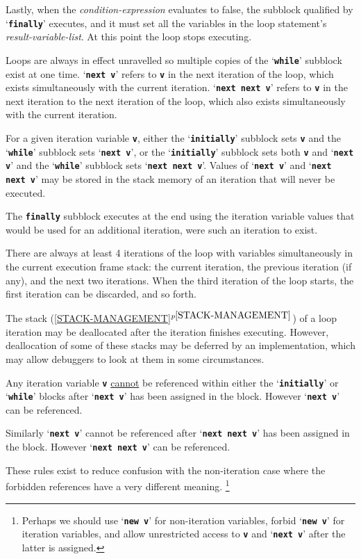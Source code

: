 \documentclass[12pt]{article}
\makeatletter
\newcommand{\TT}[1]{{\tt \bfseries #1}}
\newcommand{\ttkey}[1]{\TT{#1}\index{#1@{\tt #1}}}
\newcommand{\itemref}[1]{\ref{#1}$^{p\pageref{#1}}$}
\makeatother
\begin{document}
Lastly, when
the {\em condition-expression} evaluates to false, the
subblock qualified by `\ttkey{finally}'
executes, and it must set all the variables in the
loop statement's {\em result-variable-list}.  At this point the loop stops
executing.

Loops are always in effect unravelled so multiple copies of
the `\TT{while}' subblock exist at one time.
`\TT{next v}' refers to \TT{v} in the
next iteration of the loop, which exists simultaneously with
the current iteration.  `\TT{next next v}' refers to \TT{v}
in the next iteration to the next iteration of the loop, which
also exists simultaneously with the current iteration.

For a given iteration variable \TT{v},
either the `\TT{initially}' subblock sets \TT{v}
and the `\TT{while}' subblock sets `\TT{next v}',
or the `\TT{initially}' subblock sets both \TT{v} and `\TT{next v}'
and the `\TT{while}' subblock sets `\TT{next next v}'.
Values of `\TT{next v}' and `\TT{next next v}' may be stored in
the stack memory of an iteration that will never be executed.

The \TT{finally} subblock executes at the end using the iteration
variable values that would be used for an additional iteration,
were such an iteration to exist.

There are always at least 4 iterations of the loop with variables
simultaneously in the current execution frame stack: the current iteration,
the previous iteration (if any), and the next two iterations.
When the third iteration of the loop starts, the first
iteration can be discarded, and so forth.

The stack (\itemref{STACK-MANAGEMENT})
of a loop iteration may be deallocated after the
iteration finishes executing.
However, deallocation of some of these stacks may be deferred by
an implementation, which may allow debuggers to look at them
in some circumstances.

Any iteration variable \TT{v} \underline{cannot} be referenced
within either the `\TT{initially}' or `\TT{while}' blocks
after `\TT{next v}' has been assigned in the block.
However `\TT{next v}' can be referenced.

Similarly `\TT{next v}' cannot be referenced
after `\TT{next next v}' has been assigned in the block.
However `\TT{next next v}' can be referenced.

These rules exist to reduce confusion with the non-iteration
case where the forbidden references have a very different meaning.%
\footnote{Perhaps we should use `\TT{new v}' for non-iteration
variables, forbid `\TT{new v}' for iteration variables, and
allow unrestricted access to \TT{v} and `\TT{next v}' after the
latter is assigned.}
\end{document}
